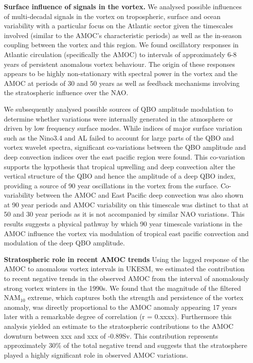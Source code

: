\textbf{Surface influence of signals in the vortex.}
We analysed possible influences of multi-decadal signals in the vortex on tropospheric, surface and ocean variability with a particular focus on the Atlantic sector given the timescales involved (similar to the AMOC's characteristic periods) as well as the in-season coupling between the vortex and this region. We found oscillatory responses in Atlantic circulation (specifically the AMOC) to intervals of approximately 6-8 years of persistent anomalous vortex behaviour. The origin of these responses appears to be highly non-stationary with spectral power in the vortex and the AMOC at periods of 30 and 50 years as well as feedback mechanisms involving the stratospheric influence over the NAO. 

We subsequently analysed possible sources of QBO amplitude modulation to determine whether variations were internally generated in the atmosphere or driven by low frequency surface modes. While indices of major surface variation such as the Nino3.4 and AL failed to account for large parts of the QBO and vortex wavelet spectra, significant co-variations between the QBO amplitude and deep convection indices over the east pacific region were found. This co-variation supports the hypothesis that tropical upwelling and deep convection alter the vertical structure of the QBO and hence the amplitude of a deep QBO index, providing a source of 90 year oscillations in the vortex from the surface. Co-variability between the AMOC and East Pacific deep convection was also shown at 90 year periods and AMOC variability on this timescale was distinct to that at 50 and 30 year periods as it is not accompanied by similar NAO variations. This results suggests a physical pathway by which 90 year timescale variations in the AMOC influence the vortex via modulation of tropical east pacific convection and modulation of the deep QBO amplitude. 

\textbf{Stratospheric role in recent AMOC trends}
Using the lagged response of the AMOC to anomalous vortex intervals in UKESM, we estimated the contribution to recent negative trends in the observed AMOC from the interval of anomalously strong vortex winters in the 1990s. We found that the magnitude of the filtered NAM$_{10}$ extreme, which captures both the strength and persistence of the vortex anomaly, was directly proportional to the AMOC anomaly appearing 17 years later with a remarkable degree of correlation (r = 0.xxxx). Furthermore this analysis yielded an estimate to the stratospheric contributions to the AMOC downturn between xxx and xxx of -0.89Sv. This contribution represents approximately 30\% of the total negative trend and suggests that the stratosphere played a highly significant role in observed AMOC variations. 

